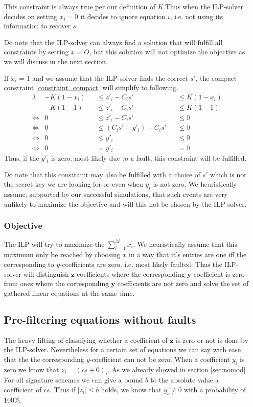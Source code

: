 \documentclass[a4paper,titlepage]{article}
\begin{document}
This constraint is always true per our definition of $K$.Thus when the ILP-solver decides on setting $x_{i} = 0$ it decides to ignore equation $i$, i.e. not using its information to recover $s$.

Do note that the ILP-solver can always find a solution that will fulfill all constraints by setting $x = O$, but this solution will not optimize the objective as we will discuss in the next section.  

If $x_{i}$ = 1 and we assume that the ILP-solver finds the correct $s'$, the compact constraint \eqref{constraint_compact} will simplify to following.
\begin{alignat}{3}
	 &-K(1 - x_{i}) &&\leq z'_{i} - C_{i}s'  &&\leq K (1 - x_{i}) \\
	 &-K(1 - 1) &&\leq z'_{i} - C_{i}s'  &&\leq K (1 - 1) \\
	 \Leftrightarrow&0&&\leq z'_{i} - C_{i}s'  &&\leq 0 \\
	 \Leftrightarrow&0 &&\leq  (C_{i}s' + y'_{i}) - C_{i}s'  &&\leq 0 \\
	 \Leftrightarrow&0&&\leq  y'_{i}  &&\leq 0 \\
	  \Leftrightarrow&0&&=  y'_{i}   &&= 0
\end{alignat}
Thus, if the $y'_{i}$ is zero, most likely due to a fault, this constraint will be fulfilled.

Do note that this constraint may also be fulfilled with a choice of $s'$ which is not the secret key we are looking for or even when $y_{i}$ is not zero.
We heuristically assume, supported by our successful simulations, that such events are very unlikely to maximize the objective and will this not be chosen by the ILP-solver.

\subsubsection{Objective}
The ILP will try to maximize the $\sum_{i = 1}^M x_{i}$.
We heuristically assume that this maximum only be reached by choosing $x$ in a way that it's entries are one iff the corresponding to $y$-coefficients are zero, i.e. most likely faulted.
Thus the ILP-solver will distinguish $\bm{z}$ coefficients where the corresponding $\bm{y}$ coefficient is zero from ones where the corresponding $\bm{y}$ coefficients are not zero and solve the set of gathered linear equations at the same time.

\subsection{Pre-filtering equations without faults}
\label{sec:prefilter}
The heavy lifting of classifying whether a coefficient of $\bm{z}$ is zero or not is done by the ILP-solver.
Nevertheless for a certain set of equations we can say with ease that the the corresponding $y$-coefficient can not be zero.
When a coefficient $y_{i}$ is zero we know that $z_{i} = (c s + 0)_{i}$. As we already showed in section \ref{sec:nomod} For all signature schemes we can give a bound $b$ to the absolute value a coefficient of $cs$. Thus if $\lvert z_{i} \rvert \leq b$ holds, we know that $y_{i} \neq 0$ with a probability of $100\%$.
\end{document}
